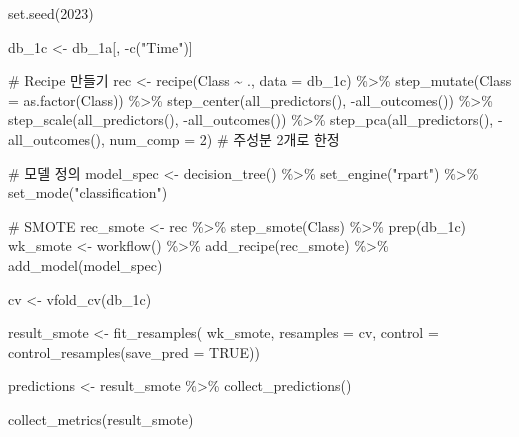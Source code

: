 \documentclass[
  letterpaper,
  DIV=11,
  numbers=noendperiod]{scrreprt}
\newenvironment{Shaded}{\begin{snugshade}}{\end{snugshade}}
\newcommand{\AttributeTok}[1]{\textcolor[rgb]{0.40,0.45,0.13}{#1}}
\newcommand{\CommentTok}[1]{\textcolor[rgb]{0.37,0.37,0.37}{#1}}
\newcommand{\ConstantTok}[1]{\textcolor[rgb]{0.56,0.35,0.01}{#1}}
\newcommand{\DecValTok}[1]{\textcolor[rgb]{0.68,0.00,0.00}{#1}}
\newcommand{\FunctionTok}[1]{\textcolor[rgb]{0.28,0.35,0.67}{#1}}
\newcommand{\NormalTok}[1]{\textcolor[rgb]{0.00,0.23,0.31}{#1}}
\newcommand{\OtherTok}[1]{\textcolor[rgb]{0.00,0.23,0.31}{#1}}
\newcommand{\SpecialCharTok}[1]{\textcolor[rgb]{0.37,0.37,0.37}{#1}}
\newcommand{\StringTok}[1]{\textcolor[rgb]{0.13,0.47,0.30}{#1}}
\begin{document}
\begin{Shaded}
\begin{Highlighting}[]
\FunctionTok{set.seed}\NormalTok{(}\DecValTok{2023}\NormalTok{)}

\NormalTok{db\_1c }\OtherTok{\textless{}{-}}\NormalTok{ db\_1a[, }\SpecialCharTok{{-}}\FunctionTok{c}\NormalTok{(}\StringTok{"Time"}\NormalTok{)]}

\CommentTok{\# Recipe 만들기}
\NormalTok{rec }\OtherTok{\textless{}{-}} \FunctionTok{recipe}\NormalTok{(Class }\SpecialCharTok{\textasciitilde{}}\NormalTok{ ., }\AttributeTok{data =}\NormalTok{ db\_1c) }\SpecialCharTok{\%\textgreater{}\%}
  \FunctionTok{step\_mutate}\NormalTok{(}\AttributeTok{Class =} \FunctionTok{as.factor}\NormalTok{(Class)) }\SpecialCharTok{\%\textgreater{}\%}
  \FunctionTok{step\_center}\NormalTok{(}\FunctionTok{all\_predictors}\NormalTok{(),  }\SpecialCharTok{{-}}\FunctionTok{all\_outcomes}\NormalTok{()) }\SpecialCharTok{\%\textgreater{}\%}
  \FunctionTok{step\_scale}\NormalTok{(}\FunctionTok{all\_predictors}\NormalTok{(),  }\SpecialCharTok{{-}}\FunctionTok{all\_outcomes}\NormalTok{()) }\SpecialCharTok{\%\textgreater{}\%}
  \FunctionTok{step\_pca}\NormalTok{(}\FunctionTok{all\_predictors}\NormalTok{(),  }\SpecialCharTok{{-}}\FunctionTok{all\_outcomes}\NormalTok{(), }\AttributeTok{num\_comp =} \DecValTok{2}\NormalTok{) }\CommentTok{\# 주성분 2개로 한정}

\CommentTok{\# 모델 정의}
\NormalTok{model\_spec }\OtherTok{\textless{}{-}} \FunctionTok{decision\_tree}\NormalTok{() }\SpecialCharTok{\%\textgreater{}\%}
  \FunctionTok{set\_engine}\NormalTok{(}\StringTok{"rpart"}\NormalTok{) }\SpecialCharTok{\%\textgreater{}\%}
  \FunctionTok{set\_mode}\NormalTok{(}\StringTok{"classification"}\NormalTok{)}

\CommentTok{\# SMOTE}
\NormalTok{rec\_smote }\OtherTok{\textless{}{-}}\NormalTok{ rec }\SpecialCharTok{\%\textgreater{}\%} \FunctionTok{step\_smote}\NormalTok{(Class) }\SpecialCharTok{\%\textgreater{}\%} \FunctionTok{prep}\NormalTok{(db\_1c)}
\NormalTok{wk\_smote }\OtherTok{\textless{}{-}} \FunctionTok{workflow}\NormalTok{() }\SpecialCharTok{\%\textgreater{}\%} \FunctionTok{add\_recipe}\NormalTok{(rec\_smote) }\SpecialCharTok{\%\textgreater{}\%} \FunctionTok{add\_model}\NormalTok{(model\_spec)}

\NormalTok{cv }\OtherTok{\textless{}{-}} \FunctionTok{vfold\_cv}\NormalTok{(db\_1c)}

\NormalTok{result\_smote }\OtherTok{\textless{}{-}} \FunctionTok{fit\_resamples}\NormalTok{(}
\NormalTok{  wk\_smote, }
  \AttributeTok{resamples =}\NormalTok{ cv, }
  \AttributeTok{control =} \FunctionTok{control\_resamples}\NormalTok{(}\AttributeTok{save\_pred =} \ConstantTok{TRUE}\NormalTok{))}

\NormalTok{predictions }\OtherTok{\textless{}{-}}\NormalTok{ result\_smote }\SpecialCharTok{\%\textgreater{}\%} 
  \FunctionTok{collect\_predictions}\NormalTok{()}

\FunctionTok{collect\_metrics}\NormalTok{(result\_smote)}
\end{Highlighting}
\end{Shaded}
\end{document}
